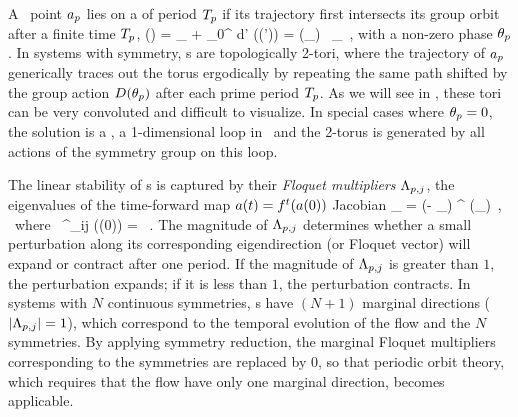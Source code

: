 A \statesp\ point $a_{p}$ lies on a \emph{\rpo} of period
${T_{p}}$ if its trajectory first intersects its group orbit after
a finite time ${T_{p}}$,
\beq
\ssp(\period{\rpprime})
    = \ssp_\rpprime
     + \int_0^\period{\rpprime} \!\!\!\!d\tau' \vel(\ssp (\tau'))
    = \matrixRep(\theta_\rpprime) \,  \ssp_\rpprime
  \,,
with a non-zero phase $\theta_{p}$.
In systems with 
symmetry, \rpo s are topologically 2-tori, where the trajectory of
$a_{p}$ generically traces out the torus ergodically by
repeating the same path shifted by the group action
${D}(\theta_{p})$ after each prime period
${T_{p}}$. As we will see in , these tori
can be very convoluted and difficult to visualize. In special cases where
$\theta_{p}=0$, the solution is a \po, a 1-dimensional loop in \statesp\ and
the 2-torus is generated by all actions of the symmetry group on this
loop.

The linear stability of \rpo s is captured by their \emph{Floquet
multipliers}  $\Lambda_{p,j}$, the eigenvalues of the time-forward map
$a(t)={f^{t}(a(0))}$ Jacobian
\beq
\jMpsRed_{\rpprime}
= \matrixRep(- \theta_\rpprime ) \jMps^\period{\rpprime} (\ssp_\rpprime)
\,, \; \mbox{~where~}\;
\jMps^{\zeit}_{ij} (\ssp(0)) = \, .
The magnitude of $\Lambda_{p,j}$ determines whether a small perturbation
along its corresponding eigendirection (or Floquet vector) will expand or
contract after one period. If the magnitude of $\Lambda_{p,j}$ is
greater than $1$, the perturbation expands; if it is less than $1$, the
perturbation contracts. In systems with $N$ continuous symmetries, \rpo s
have $(N+1)$ marginal directions ($\left|\Lambda_{p,j}\right| = 1$),
which correspond to the temporal evolution of the flow and the $N$
symmetries. By applying symmetry reduction, the marginal Floquet
multipliers corresponding to the symmetries are replaced by $0$, so that
periodic orbit theory, which requires that the flow have only one
marginal direction, becomes applicable.

